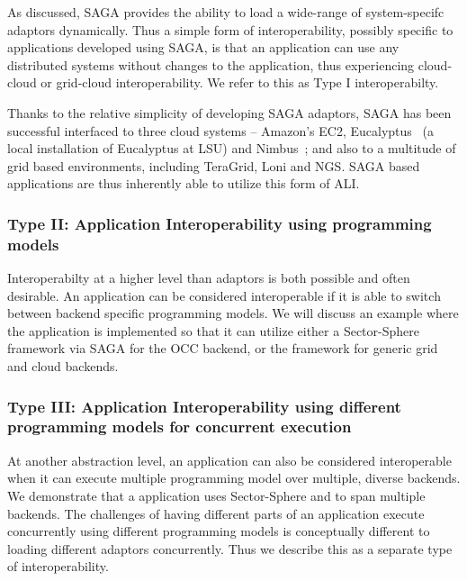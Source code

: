 \documentclass[3p,twocolumn]{elsarticle}
\begin{document}
As discussed, SAGA provides the ability to load a wide-range of
system-specifc adaptors dynamically. Thus a simple form of
interoperability, possibly specific to applications developed using
SAGA, is that an application can use any distributed systems without
changes to the application, thus experiencing cloud-cloud or
grid-cloud interoperability.  We refer to this as Type I
interoperabilty.


Thanks to the relative simplicity of developing SAGA adaptors, SAGA
has been successful interfaced to three cloud systems -- Amazon's EC2,
Eucalyptus~\cite{eucalyptus} (a local installation of Eucalyptus at
LSU) and Nimbus~\cite{nimbus}; and also to a multitude of grid based
environments, including TeraGrid, Loni and NGS.  SAGA based
applications are thus inherently able to utilize this form of ALI.

\subsubsection{Type II: Application Interoperability using programming
  models} %
%
%

Interoperabilty at a higher level than adaptors is both possible and
often desirable. An application can be considered interoperable if it
is able to switch between backend specific programming models.  We
will discuss an example where the \wc application is implemented so
that it can utilize either a Sector-Sphere framework via SAGA for the
OCC backend, or the \smr framework for generic grid and cloud
backends.


\subsubsection{Type III: Application Interoperability using different
  programming models for concurrent execution}
%
%

At another abstraction level, an application can also be considered
interoperable when it can  execute multiple
programming model over multiple, diverse backends.  We demonstrate
that a \wc application uses Sector-Sphere and \smr to span multiple
backends.  The challenges of having different parts of an application
execute concurrently using different programming models is
conceptually different to loading different adaptors
concurrently. Thus we describe this as a separate type of
interoperability.
\end{document}
